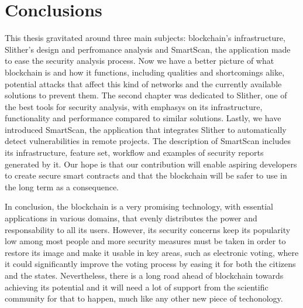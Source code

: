 \chapter*{Conclusions} 

This thesis gravitated around three main subjects: blockchain's infrastructure, Slither's design and perfromance analysis and SmartScan, the application made to ease the security analysis process. Now we have a better picture of what blockchain is and how it functions, including qualities and shortcomings alike, potential attacks that affect this kind of networks and the currently available solutions to prevent them. The second chapter was dedicated to Slither, one of the best tools for security analysis, with emphasys on its infrastructure, functionality and performance compared to similar solutions. Lastly, we have introduced SmartScan, the application that integrates Slither to automatically detect vulnerabilities in remote projects. The description of SmartScan includes its infrastructure, feature set, workflow and examples of security reports generated by it. Our hope is that our contribution will enable aspiring developers to create secure smart contracts and that the blockchain will be safer to use in the long term as a consequence.

In conclusion, the blockchain is a very promising technology, with essential applications in various domains, that evenly distributes the power and responsability to all its users. However, its security concerns keep its popularity low among most people and more security measures must be taken in order to restore its image and make it usable in key areas, such as electronic voting, where it could significantly improve the voting process by easing it for both the citizens and the states. Nevertheless, there is a long road ahead of blockchain towards achieving its potential and it will need a lot of support from the scientific community for that to happen, much like any other new piece of techonology.



